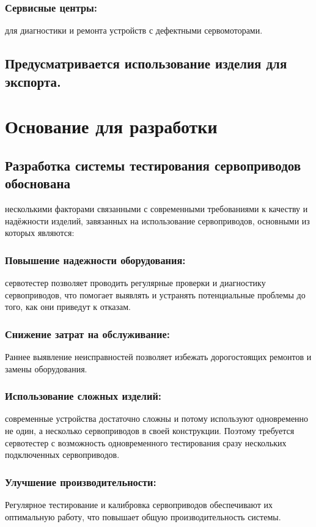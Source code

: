 \documentclass[a4paper]{bsuir-tor}
\begin{document}
  \subsubsection{Сервисные центры: }
  для диагностики и ремонта устройств с дефектными сервомоторами.
  

\subsection{Предусматривается использование изделия для экспорта.}

\section{Основание для разработки}

\subsection{Разработка системы тестирования сервоприводов обоснована}
несколькими
факторами связанными с современными требованиями к качеству и
надёжности изделий, завязанных на использование сервоприводов,
основными из которых являются:

  \subsubsection{Повышение надежности оборудования: }
  сервотестер позволяет проводить регулярные проверки и диагностику
  сервоприводов, что помогает выявлять и устранять потенциальные
  проблемы до того, как они приведут к отказам.
  
  \subsubsection{Снижение затрат на обслуживание: }
  Раннее выявление неисправностей позволяет избежать дорогостоящих
  ремонтов и замены оборудования.
  
  \subsubsection{Использование сложных изделий: }
  современные устройства достаточно сложны и потому используют
  одновременно не один, а несколько сервоприводов в своей конструкции.
  Поэтому требуется сервотестер с возможность одновременного
  тестирования сразу нескольких подключенных сервоприводов.

  \subsubsection{Улучшение производительности: }
  Регулярное тестирование и калибровка сервоприводов обеспечивают их
  оптимальную работу, что повышает общую производительность системы.
  
\end{document}

